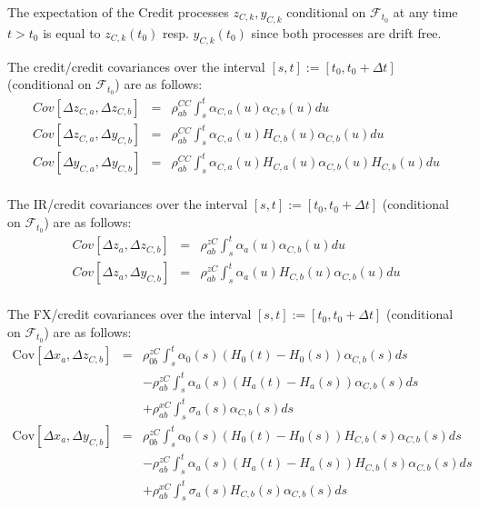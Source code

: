 \documentclass[12pt, a4paper]{article}
\begin{document}
{{\begin{appendix}
The expectation of the Credit processes $z_{C,k}, y_{C,k}$ conditional on $\mathcal{F}_{t_0}$ at any time $t>t_0$ is
equal to $z_{C,k}(t_0)$ resp. $y_{C,k}(t_0)$ since both processes are drift free.

The credit/credit covariances over the interval $[s,t] := [t_0, t_0+\Delta t]$ (conditional on $\mathcal{F}_{t_0}$) are as follows:
\begin{eqnarray*}
	Cov \left[\Delta z_{C,a}, \Delta z_{C,b} \right] &=&
	\rho_{ab}^{CC}\int_s^t \alpha_{C, a}(u) \alpha_{C, b}(u) du\\
  Cov \left[\Delta z_{C,a}, \Delta y_{C,b} \right] &=&
	\rho_{ab}^{CC}\int_s^t \alpha_{C, a}(u) H_{C,b}(u) \alpha_{C, b}(u) du\\
  Cov \left[\Delta y_{C,a}, \Delta y_{C,b} \right] &=&
	\rho_{ab}^{CC}\int_s^t \alpha_{C, a}(u) H_{C,a}(u) \alpha_{C, b}(u) H_{C,b}(u) du\\
\end{eqnarray*}

The IR/credit covariances over the interval $[s,t] := [t_0, t_0+\Delta t]$ (conditional on $\mathcal{F}_{t_0}$) are as follows:
\begin{eqnarray*}
	Cov \left[\Delta z_a, \Delta z_{C,b} \right] &=&
	\rho_{ab}^{zC}\int_s^t \alpha_a(u) \alpha_{C, b}(u) du\\
  Cov \left[\Delta z_a, \Delta y_{C,b} \right] &=&
	\rho_{ab}^{zC}\int_s^t \alpha_a(u) H_{C,b}(u) \alpha_{C, b}(u) du\\
\end{eqnarray*}

The FX/credit covariances over the interval $[s,t] := [t_0, t_0+\Delta t]$ (conditional on $\mathcal{F}_{t_0}$) are as follows:
\begin{eqnarray*}
  \mathrm{Cov}[ \Delta x_a, \Delta z_{C,b} ] & = & \rho_{0b}^{zC} \int_s^t \alpha_0(s) (H_0(t)-H_0(s)) \alpha_{C,b}(s) ds \\
                                             & & -\rho_{ab}^{zC} \int_s^t \alpha_a(s)(H_a(t)-H_a(s))\alpha_{C,b}(s) ds \\
                                             & & +\rho_{ab}^{xC}\int_s^t \sigma_a(s) \alpha_{C,b}(s) ds \\
  \mathrm{Cov}[ \Delta x_a, \Delta y_{C,b} ] & = & \rho_{0b}^{zC} \int_s^t \alpha_0(s) (H_0(t)-H_0(s)) H_{C,b}(s)\alpha_{C,b}(s) ds \\
                                             & & -\rho_{ab}^{zC} \int_s^t \alpha_a(s)(H_a(t)-H_a(s))H_{C,b}(s)\alpha_{C,b}(s) ds \\
                                             & & +\rho_{ab}^{xC}\int_s^t \sigma_a(s) H_{C,b}(s)\alpha_{C,b}(s) ds
\end{eqnarray*}


\end{appendix}}}
\end{document}
